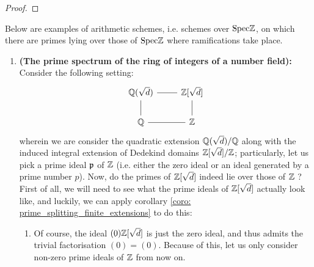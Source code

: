                 \begin{proposition}
                
                \end{proposition}
                    \begin{proof}
                        
                    \end{proof}
                
                \begin{example}
                    Below are examples of arithmetic schemes, i.e. schemes over $\mathrm{Spec} \mathbb{Z}$, on which there are primes lying over those of $\mathrm{Spec} \mathbb{Z}$ where ramifications take place.
                        \begin{enumerate}
                            \item \textbf{(The prime spectrum of the ring of integers of a number field):} Consider the following setting:
                                $$
                                    \begin{tikzcd}
                                    	{\Q(\sqrt{d})} & {\Z[\sqrt{d}]} \\
                                    	\Q & \Z
                                    	\arrow[no head, from=2-1, to=1-1]
                                    	\arrow[no head, from=2-2, to=1-2]
                                    	\arrow[no head, from=1-1, to=1-2]
                                    	\arrow[no head, from=2-1, to=2-2]
                                    \end{tikzcd}
                                $$
                            wherein we are consider the quadratic extension $\mathbb{Q}(\sqrt{d})/\mathbb{Q}$ along with the induced integral extension of Dedekind domains $\mathbb{Z}[\sqrt{d}]/\mathbb{Z}$; particularly, let us pick a prime ideal $\mathfrak{p}$ of $\mathbb{Z}$ (i.e. either the zero ideal or an ideal generated by a prime number $p$). Now, do the primes of $\mathbb{Z}[\sqrt{d}]$ indeed lie over those of $\mathbb{Z}$ ? First of all, we will need to see what the prime ideals of $\mathbb{Z}[\sqrt{d}]$ actually look like, and luckily, we can apply corollary \ref{coro: prime_splitting_finite_extensions} to do this:
                                \begin{enumerate}
                                    \item Of course, the ideal $(0)\mathbb{Z}[\sqrt{d}]$ is just the zero ideal, and thus admits the trivial factorisation $(0) = (0)$. Because of this, let us only consider non-zero prime ideals of $\mathbb{Z}$ from now on.

\end{enumerate}
\end{enumerate}
\end{example}
